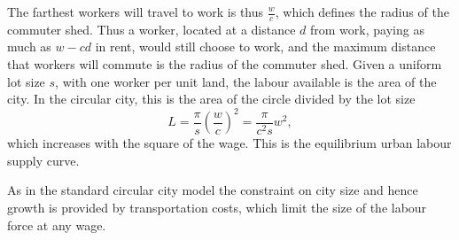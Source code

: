 
The farthest workers will travel to work is thus $\frac{w}{{c}}$, which defines the radius of the commuter shed. Thus a worker, located at a distance $d$ from work, paying as much as $w-{c} d$ in rent, would still choose to work, and the maximum distance that workers will commute is the radius of the commuter shed. Given a uniform lot size $s$, with one worker per unit land, the labour available is the area of the city. In the circular city, this is the area of the circle divided by the lot size
\begin{equation}
                 L%
			=\frac{\pi}{s}  \left(\frac{w}{{c}}\right)^2
			=\frac{\pi}{{c}^2 s} w^2, \label{eqn-labour-supply2}
\end{equation}
which increases with the square of the wage. This is the equilibrium urban labour supply curve.

As in the standard circular city model the constraint on city size and hence growth is provided by transportation costs, which limit the size of the labour force at any wage. 



